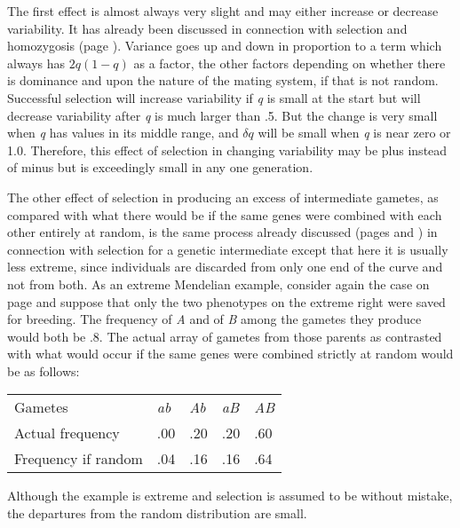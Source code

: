 The first effect is almost always very slight and may either increase
or decrease variability. It has already been discussed in connection with
selection and homozygosis (page \pageref{sel_and_homozyg}). Variance goes up and down in
proportion to a term which always has $2q(1 - q)$ as a factor, the other
factors depending on whether there is dominance and upon the nature
of the mating system, if that is not random. Successful selection will
increase variability if \textit{q} is small at the start but will decrease variability
after \textit{q} is much larger than .5. But the change is very small when \textit{q} has
values in its middle range, and ${\delta}q$ will be small when \textit{q} is near zero or
1.0. Therefore, this effect of selection in changing variability may be
plus instead of minus but is exceedingly small in any one generation.

The other effect of selection in producing an excess of intermediate
gametes, as compared with what there would be if the same genes were
combined with each other entirely at random, is the same process
already discussed (pages \pageref{page136} and \pageref{page137}) in connection with selection for a
genetic intermediate except that here it is usually less extreme, since
individuals are discarded from only one end of the curve and not from
both. As an extreme Mendelian example, consider again the case on
page \pageref{page137} and suppose that only the two phenotypes on the extreme
right were saved for breeding. The frequency of \textit{A} and of \textit{B} among the
gametes they produce would both be .8. The actual array of gametes
from those parents as contrasted with what would occur if the same
genes were combined strictly at random would be as follows:

\begin{table}[htbp]
	\centering
	\begin{tabular}{L{4.5cm}C{1.5cm}C{1.5cm}C{1.5cm}C{1.5cm}}
	Gametes				& \textit{ab}	& \textit{Ab}	& \textit{aB}	& \textit{AB}	\\
	Actual frequency	& .00			& .20			& .20			& .60			\\
	Frequency if random	& .04			& .16			& .16			& .64			\\
	\end{tabular}
\end{table}

\noindent
Although the example is extreme and selection is assumed to be without
mistake, the departures from the random distribution are small.

